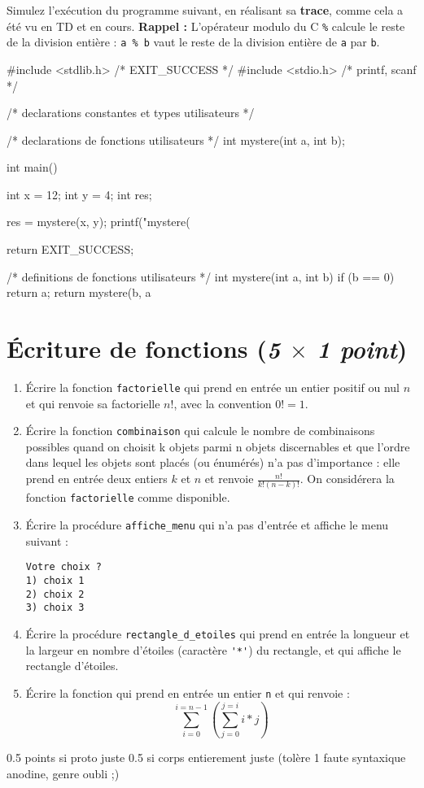Simulez l'exécution du programme suivant, en réalisant sa \textbf{trace}, comme cela a été vu en TD et en cours.
\textbf{Rappel : } L'opérateur modulo du C \verb|%| calcule le reste de la division entière : \verb|a % b| vaut le reste de la division entière de \verb|a| par \verb|b|.

\begin{small}
\begin{listing}{1}
#include <stdlib.h> /* EXIT_SUCCESS */
#include <stdio.h> /* printf, scanf */

/* declarations constantes et types utilisateurs */

/* declarations de fonctions utilisateurs */
int mystere(int a, int b);

int main()
{
  int x = 12;
  int y = 4;
  int res;
 
  res = mystere(x, y);
  printf("mystere(%

    return EXIT_SUCCESS;
}

/* definitions de fonctions utilisateurs */
int mystere(int a, int b)
{
   if (b == 0) 
    {
        return a;
    }
    return mystere(b, a %
}
\end{listing}
\end{small}

\section{Écriture de fonctions (\textit{5 $\times$ 1 point})}

\begin{enumerate}
\item Écrire la fonction \verb|factorielle| qui prend en entrée un entier positif ou nul $n$ et qui renvoie sa factorielle $n!$, avec la convention $0! = 1$.
\item Écrire la fonction \verb|combinaison| qui calcule le nombre de combinaisons possibles quand on choisit k objets parmi n objets discernables et que l'ordre dans lequel les objets sont placés (ou énumérés) n'a pas d'importance : elle prend en entrée deux entiers $k$ et $n$ et renvoie $\frac{n!}{k!(n-k)!}$. On considérera la fonction \verb|factorielle| comme disponible. 
\item Écrire la procédure \verb|affiche_menu| qui n'a pas d'entrée et affiche le menu suivant :
\begin{verbatim}
Votre choix ?
1) choix 1
2) choix 2
3) choix 3
\end{verbatim}
\item Écrire la procédure \verb|rectangle_d_etoiles| qui prend en
  entrée la longueur et la largeur en nombre d'étoiles (caractère \verb|'*'|) du rectangle,
  et qui affiche le rectangle d'étoiles.
\item Écrire la fonction qui prend en entrée un entier \verb|n| et qui renvoie : \[\sum_{i=0}^{i=n-1} (\sum_{j=0}^{j=i}i*j)\]
\end{enumerate}

\begin{correction}
0.5 points si proto juste
0.5 si corps entierement juste (tolère 1 faute syntaxique anodine, genre oubli ;)
\end{correction}
